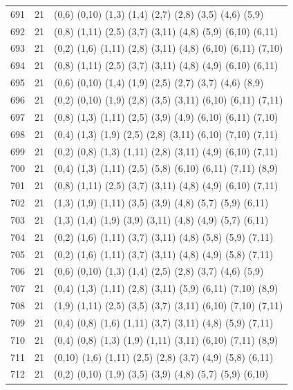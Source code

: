 \begin{appendix}
{\begin{longtable}{lll}
691& 21 & (0,6)   (0,10) (1,3)  (1,4)   (2,7)   (2,8)   (3,5)   (4,6)   (5,9)\\
692& 21 & (0,8)   (1,11) (2,5)  (3,7)   (3,11)  (4,8)   (5,9)   (6,10)  (6,11)\\
693& 21 & (0,2)   (1,6)  (1,11) (2,8)   (3,11)  (4,8)   (6,10)  (6,11)  (7,10)\\
694& 21 & (0,8)   (1,11) (2,5)  (3,7)   (3,11)  (4,8)   (4,9)   (6,10)  (6,11)\\
695& 21 & (0,6)   (0,10) (1,4)  (1,9)   (2,5)   (2,7)   (3,7)   (4,6)   (8,9)\\
696& 21 & (0,2)   (0,10) (1,9)  (2,8)   (3,5)   (3,11)  (6,10)  (6,11)  (7,11)\\
697& 21 & (0,8)   (1,3)  (1,11) (2,5)   (3,9)   (4,9)   (6,10)  (6,11)  (7,10)\\
698& 21 & (0,4)   (1,3)  (1,9)  (2,5)   (2,8)   (3,11)  (6,10)  (7,10)  (7,11)\\
699& 21 & (0,2)   (0,8)  (1,3)  (1,11)  (2,8)   (3,11)  (4,9)   (6,10)  (7,11)\\
700& 21 & (0,4)   (1,3)  (1,11) (2,5)   (5,8)   (6,10)  (6,11)  (7,11)  (8,9)\\
701& 21 & (0,8)   (1,11) (2,5)  (3,7)   (3,11)  (4,8)   (4,9)   (6,10)  (7,11)\\
702& 21 & (1,3)   (1,9)  (1,11) (3,5)   (3,9)   (4,8)   (5,7)   (5,9)   (6,11)\\
703& 21 & (1,3)   (1,4)  (1,9)  (3,9)   (3,11)  (4,8)   (4,9)   (5,7)   (6,11)\\
704& 21 & (0,2)   (1,6)  (1,11) (3,7)   (3,11)  (4,8)   (5,8)   (5,9)   (7,11)\\
705& 21 & (0,2)   (1,6)  (1,11) (3,7)   (3,11)  (4,8)   (4,9)   (5,8)   (7,11)\\
706& 21 & (0,6)   (0,10) (1,3)  (1,4)   (2,5)   (2,8)   (3,7)   (4,6)   (5,9)\\
707& 21 & (0,4)   (1,3)  (1,11) (2,8)   (3,11)  (5,9)   (6,11)  (7,10)  (8,9)\\
708& 21 & (1,9)   (1,11) (2,5)  (3,5)   (3,7)   (3,11)  (6,10)  (7,10)  (7,11)\\
709& 21 & (0,4)   (0,8)  (1,6)  (1,11)  (3,7)   (3,11)  (4,8)   (5,9)   (7,11)\\
710& 21 & (0,4)   (0,8)  (1,3)  (1,9)   (1,11)  (3,11)  (6,10)  (7,11)  (8,9)\\
711& 21 & (0,10)  (1,6)  (1,11) (2,5)   (2,8)   (3,7)   (4,9)   (5,8)   (6,11)\\
712& 21 & (0,2)   (0,10) (1,9)  (3,5)   (3,9)   (4,8)   (5,7)   (5,9)   (6,10)\\

\end{longtable}}
\end{appendix}
